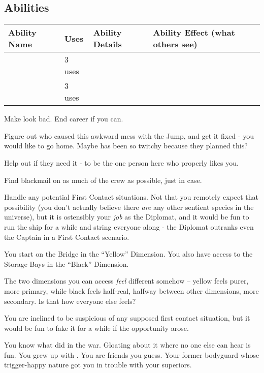 \documentclass[char]{TMFHope}
\begin{document}
\subsection*{Abilities}
\begin{tabular}{|p{3cm}|p{1.5cm}|p{7cm}|p{4.5cm}|} 
 \hline
 \textbf{Ability Name} & \textbf{Uses} & \textbf{Ability Details} & \textbf{Ability Effect (what others see)} \\ 
\hline 
 \aNegotiation{\MYname} & 3 uses & \aNegotiation{\MYtext} & \aNegotiation{\MYeffect} \\ 
\hline
 \aFirstAid{\MYname} & 3 uses & \aFirstAid{\MYtext} & \aFirstAid{\MYeffect}\\ 
 \hline
\end{tabular}

\begin{itemz}[Goals]
	\item Make \cWeap{} look bad. End \cWeap{\their} career if you can.
	\item Figure out who caused this awkward mess with the Jump, and get it fixed - you would like to go home. Maybe \cXO{} has been so twitchy because they planned this?
	\item Help \cMed{} out if they need it - \cMed{\they} \cMed{\seem} to be the one person here who properly likes you.
	\item Find blackmail on as much of the crew as possible, just in case.
	\item Handle any potential First Contact situations. Not that you remotely expect that possibility (you don't actually believe there \emph{are} any other sentient species in the universe), but it is ostensibly your \emph{job} as the Diplomat, and it would be fun to run the ship for a while and string everyone along - the Diplomat outranks even the Captain in a First Contact scenario.
\end{itemz}

\begin{itemz}[Notes]
	\item You start on the Bridge in the ``Yellow'' Dimension. You also have access to the Storage Bays in the ``Black'' Dimension. 
	\item The two dimensions you can access {\em feel} different somehow -- yellow feels purer, more primary, while black feels half-real, halfway between other dimensions, more secondary.  Is that how everyone else feels?
	\item You are inclined to be suspicious of any supposed first contact situation, but it would be fun to fake it for a while if the opportunity arose.
\end{itemz}

\begin{contacts}
	\contact{\cXO{}} You know what \cXO{\they} did in the war. Gloating about it where no one else can hear is fun.
	\contact{\cMed{}} You grew up with \cMed{\them}. You are friends you guess.
	\contact{\cWeap{}} Your former bodyguard whose trigger-happy nature got you in trouble with your superiors.
\end{contacts}
\end{document}
